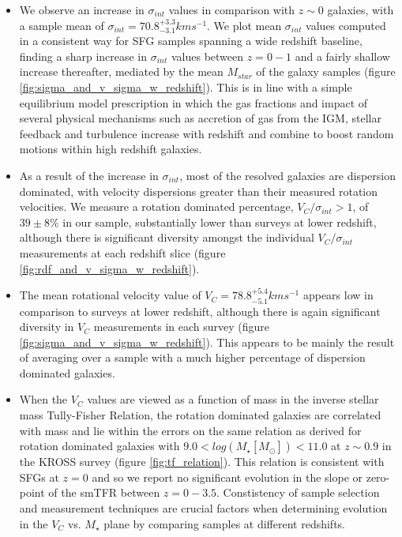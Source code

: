 \documentclass[fleqn,usenatbib]{mn2e}
\begin{document}
\begin{itemize}
    \item We observe an increase in $\sigma_{int}$ values in comparison with $z\sim0$ galaxies, with a sample mean of $\sigma_{int} = 70.8^{+3.3}_{-3.1} kms^{-1}$.
    We plot mean $\sigma_{int}$ values computed in a consistent way for SFG samples spanning a wide redshift baseline, finding a sharp increase in $\sigma_{int}$ values between $z=0-1$ and a fairly shallow increase thereafter, mediated by the mean $M_{star}$ of the galaxy samples (figure \ref{fig:sigma_and_v_sigma_w_redshift}).
    This is in line with a simple equilibrium model prescription in which the gas fractions and impact of several physical mechanisms such as accretion of gas from the IGM, stellar feedback and turbulence increase with redshift and combine to boost random motions within high redshift galaxies.
    \item As a result of the increase in $\sigma_{int}$, most of the resolved galaxies are dispersion dominated, with velocity dispersions greater than their measured rotation velocities.
    We measure a rotation dominated percentage, $V_{C}/\sigma_{int} > 1$, of $39 \pm 8 \%$ in our sample, substantially lower than surveys at lower redshift, although there is significant diversity amongst the individual $V_{C}/\sigma_{int}$ measurements at each redshift slice (figure \ref{fig:rdf_and_v_sigma_w_redshift}).
    \item The mean rotational velocity value of $V_{C} = 78.8^{+5.4}_{-5.1}kms^{-1}$ appears low in comparison to surveys at lower redshift, although there is again significant diversity in $V_{C}$ measurements in each survey (figure \ref{fig:sigma_and_v_sigma_w_redshift}).
    This appears to be mainly the result of averaging over a sample with a much higher percentage of dispersion dominated galaxies.
    \item When the $V_{C}$ values are viewed as a function of mass in the inverse stellar mass Tully-Fisher Relation, the rotation dominated galaxies are correlated with mass and lie within the errors on the same relation as derived for rotation dominated galaxies with $9.0 < log(M_{\star}[M_{\odot}]) < 11.0$ at $z\sim0.9$ in the KROSS survey (figure \ref{fig:tf_relation}). %
    This relation is consistent with SFGs at $z=0$ and so we report no significant evolution in the slope or zero-point of the smTFR between $z=0-3.5$.
    Constistency of sample selection and measurement techniques are crucial factors when determining evolution in the $V_{C}$ vs. $M_{\star}$ plane by comparing samples at different redshifts.

\end{itemize}
\end{document}
